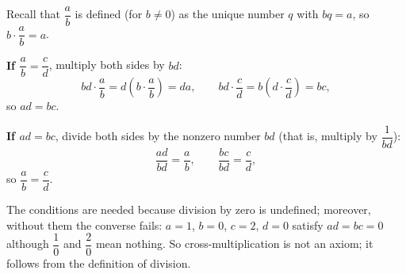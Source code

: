 Recall that $\dfrac{a}{b}$ is defined (for $b\ne0$) as the unique number $q$ with $bq=a$, so $b\cdot\dfrac{a}{b}=a$.

\textbf{If $\dfrac{a}{b}=\dfrac{c}{d}$}, multiply both sides by $bd$:
\[
bd\cdot\dfrac{a}{b}=d\left(b\cdot\dfrac {a}{b}\right)=da,\qquad bd\cdot\dfrac{c}{d}=b\left(d\cdot\dfrac {c}{d}\right)=bc,
\]
so $ad=bc$.

\textbf{If $ad=bc$}, divide both sides by the nonzero number $bd$ (that is, multiply by $\dfrac{1}{bd}$):
\[
\dfrac{ad}{bd}=\dfrac{a}{b},\qquad \dfrac{bc}{bd}=\dfrac{c}{d},
\]
so $\dfrac {a}{b}=\dfrac {c}{d}$.

The conditions are needed because division by zero is undefined; moreover, without them the converse fails: $a=1$, $b=0$, $c=2$, $d=0$ satisfy $ad=bc=0$ although $\dfrac{1}{0}$ and $\dfrac{2}{0}$ mean nothing. So cross-multiplication is not an axiom; it follows from the definition of division.
